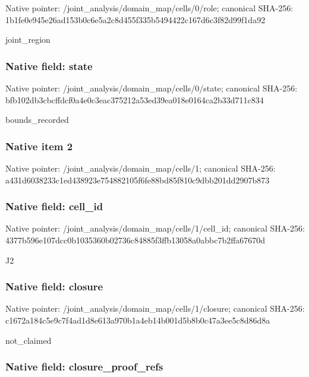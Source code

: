 \documentclass[10pt,a4paper]{article}
\begin{document}
Native pointer: /joint\_analysis/domain\_map/cells/0/role; canonical SHA-256: 1b1fe0e945e26ad153b0c6e5\allowbreak{}a2c8d455f335b5494422c167\allowbreak{}d6c3f82d99f1da92


joint\_region


\subsubsection{Native field: state}


Native pointer: /joint\_analysis/domain\_m\allowbreak{}ap/cells/0/state; canonical SHA-256: bfb102db3cbcffdcf0a4e0c3\allowbreak{}eac375212a53ed39ea018e01\allowbreak{}64ca2b33d711c834


bounds\_recorded


\subsubsection{Native item 2}


Native pointer: /joint\_analysis/domain\_map/cells/1; canonical SHA-256: a431d6038233c1ed438923e7\allowbreak{}54882105f6fe88bd85f810c9\allowbreak{}dbb201dd2907b873



\subsubsection{Native field: cell\_id}


Native pointer: /joint\_analysis/domain\_m\allowbreak{}ap/cells/1/cell\_id; canonical SHA-256: 4377b596e107dcc0b1035360\allowbreak{}b02736c84885f3ffb13058a0\allowbreak{}abbc7b2ffa67670d


J2


\subsubsection{Native field: closure}


Native pointer: /joint\_analysis/domain\_m\allowbreak{}ap/cells/1/closure; canonical SHA-256: c1672a184c5e9c7f4ad1d8e6\allowbreak{}13a970b1a4eb14b001d5b8b0\allowbreak{}c47a3ee5c8d86d8a


not\_claimed


\subsubsection{Native field: closure\_proof\_refs}
\end{document}
